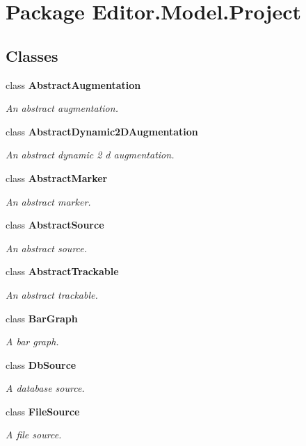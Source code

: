 \section{Package Editor.\-Model.\-Project}
\label{namespace_editor_1_1_model_1_1_project}
\subsection*{Classes}
\begin{DoxyCompactItemize}
\item 
class {\bf Abstract\-Augmentation}
\begin{DoxyCompactList}\small\item\em An abstract augmentation. \end{DoxyCompactList}\item 
class {\bf Abstract\-Dynamic2\-D\-Augmentation}
\begin{DoxyCompactList}\small\item\em An abstract dynamic 2 d augmentation. \end{DoxyCompactList}\item 
class {\bf Abstract\-Marker}
\begin{DoxyCompactList}\small\item\em An abstract marker. \end{DoxyCompactList}\item 
class {\bf Abstract\-Source}
\begin{DoxyCompactList}\small\item\em An abstract source. \end{DoxyCompactList}\item 
class {\bf Abstract\-Trackable}
\begin{DoxyCompactList}\small\item\em An abstract trackable. \end{DoxyCompactList}\item 
class {\bf Bar\-Graph}
\begin{DoxyCompactList}\small\item\em A bar graph. \end{DoxyCompactList}\item 
class {\bf Db\-Source}
\begin{DoxyCompactList}\small\item\em A database source. \end{DoxyCompactList}\item 
class {\bf File\-Source}
\begin{DoxyCompactList}\small\item\em A file source. \end{DoxyCompactList}\item 

\end{DoxyCompactItemize}
